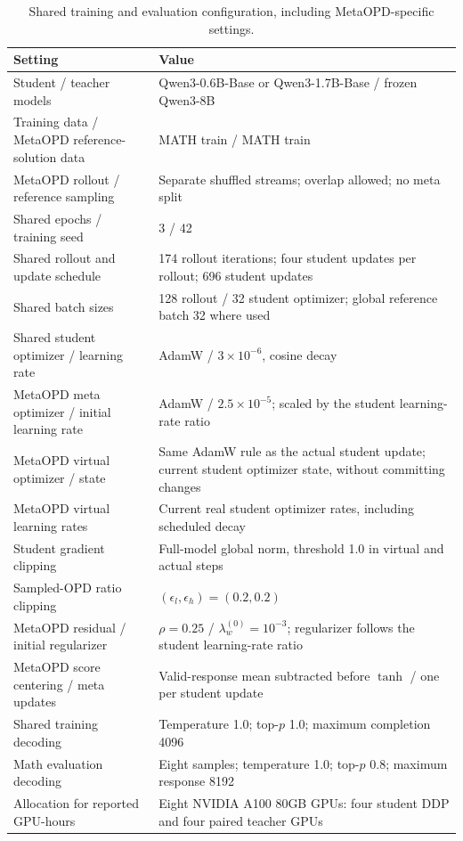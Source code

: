 \documentclass{article}
\theoremstyle{plain}
\theoremstyle{definition}
\theoremstyle{remark}
\begin{document}
\begin{table}[t]
\centering
\small
\setlength{\tabcolsep}{6pt}
\renewcommand{\arraystretch}{1.08}
\caption{Shared training and evaluation configuration, including MetaOPD-specific settings.}
\label{tab:metaopd-reproducibility}
\begin{tabular}{@{}p{}p{}@{}}
\toprule
Setting & Value \\
\midrule
Student / teacher models & Qwen3-0.6B-Base or Qwen3-1.7B-Base / frozen Qwen3-8B \\
Training data / MetaOPD reference-solution data & MATH train / MATH train \\
MetaOPD rollout / reference sampling & Separate shuffled streams; overlap allowed; no meta split \\
Shared epochs / training seed & 3 / 42 \\
Shared rollout and update schedule & 174 rollout iterations; four student updates per rollout; 696 student updates \\
Shared batch sizes & 128 rollout / 32 student optimizer; global reference batch 32 where used \\
Shared student optimizer / learning rate & AdamW / \(3\times10^{-6}\), cosine decay \\
MetaOPD meta optimizer / initial learning rate & AdamW / \(2.5\times10^{-5}\); scaled by the student learning-rate ratio \\
MetaOPD virtual optimizer / state & Same AdamW rule as the actual student update; current student optimizer state, without committing changes \\
MetaOPD virtual learning rates & Current real student optimizer rates, including scheduled decay \\
Student gradient clipping & Full-model global norm, threshold 1.0 in virtual and actual steps \\
Sampled-OPD ratio clipping & \((\epsilon_l,\epsilon_h)=(0.2,0.2)\) \\
MetaOPD residual / initial regularizer & \(\rho=0.25\) / \(\lambda_w^{(0)}=10^{-3}\); regularizer follows the student learning-rate ratio \\
MetaOPD score centering / meta updates & Valid-response mean subtracted before \(\tanh\) / one per student update \\
Shared training decoding & Temperature 1.0; top-\(p\) 1.0; maximum completion 4096 \\
Math evaluation decoding & Eight samples; temperature 1.0; top-\(p\) 0.8; maximum response 8192 \\
Allocation for reported GPU-hours & Eight NVIDIA A100 80GB GPUs: four student DDP and four paired teacher GPUs \\
\bottomrule
\end{tabular}
\end{table}
\end{document}
